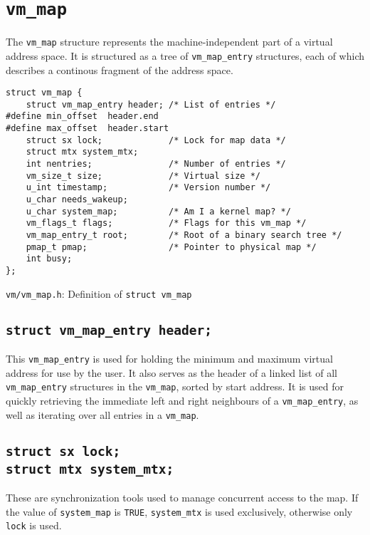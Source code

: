 \documentclass[shortabstract, english]{iithesis}
\begin{document}
\section{\texttt{vm\_map}}

The \texttt{vm\_map} structure represents the machine-independent part of a
virtual address space. It is structured as a tree of \texttt{vm\_map\_entry}
structures, each of which describes a continous fragment of the address space.


\begin{listing}[H]
\begin{verbatim}
struct vm_map {
    struct vm_map_entry header; /* List of entries */
#define min_offset  header.end
#define max_offset  header.start
    struct sx lock;             /* Lock for map data */
    struct mtx system_mtx;
    int nentries;               /* Number of entries */
    vm_size_t size;             /* Virtual size */
    u_int timestamp;            /* Version number */
    u_char needs_wakeup;
    u_char system_map;          /* Am I a kernel map? */
    vm_flags_t flags;           /* Flags for this vm_map */
    vm_map_entry_t root;        /* Root of a binary search tree */
    pmap_t pmap;                /* Pointer to physical map */
    int busy;
};
\end{verbatim}
\caption{\texttt{vm/vm\_map.h}: Definition of \texttt{struct vm\_map}}
\end{listing}

\subsection*{\texttt{struct vm_map_entry header;}}
This \texttt{vm\_map\_entry} is used for holding the minimum and maximum virtual
address for use by the user. It also serves as the header of a linked list of
all \texttt{vm\_map\_entry} structures in the \texttt{vm\_map}, sorted by start
address. It is used for quickly retrieving the immediate left and right
neighbours of a \texttt{vm\_map\_entry}, as well as iterating over all entries
in a \texttt{vm\_map}.

\subsection*{\texttt{struct sx lock;}\\
  \texttt{struct mtx system_mtx;}}
These are synchronization tools used to manage concurrent access to the map. If
the value of \texttt{system\_map} is \texttt{TRUE}, \texttt{system\_mtx} is used
exclusively, otherwise only \texttt{lock} is used.
\end{document}
